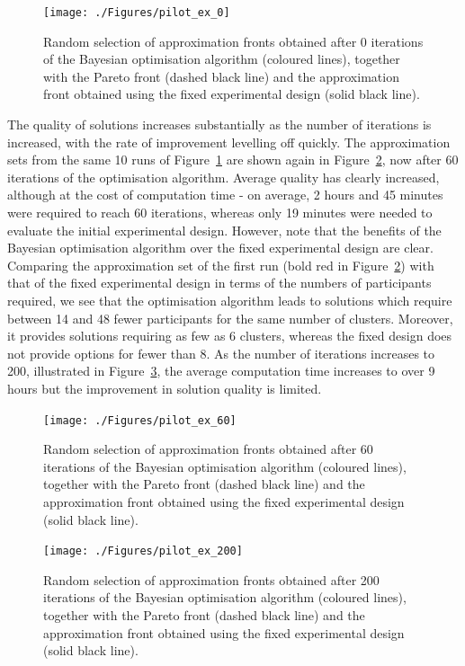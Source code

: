 \documentclass{article} %
\begin{document}
\begin{figure}
\centering
\texttt{[image: ./Figures/pilot\_ex\_0]}
\caption{Random selection of approximation fronts obtained after 0 iterations of the Bayesian optimisation algorithm (coloured lines), together with the Pareto front (dashed black line) and the approximation front obtained using the fixed experimental design (solid black line).}
\label{fig:pilot_ex_0}
\end{figure}

The quality of solutions increases substantially as the number of iterations is increased, with the rate of improvement levelling off quickly. The approximation sets from the same 10 runs of Figure~\ref{fig:pilot_ex_0} are shown again in Figure~\ref{fig:pilot_ex_60}, now after 60 iterations of the optimisation algorithm. Average quality has clearly increased, although at the cost of computation time - on average, 2 hours and 45 minutes were required to reach 60 iterations, whereas only 19 minutes were needed to evaluate the initial experimental design. However, note that the benefits of the Bayesian optimisation algorithm over the fixed experimental design are clear. Comparing the approximation set of the first run (bold red in Figure~\ref{fig:pilot_ex_60}) with that of the fixed experimental design in terms of the numbers of participants required, we see that the optimisation algorithm leads to solutions which require between 14 and 48 fewer participants for the same number of clusters. Moreover, it provides solutions requiring as few as 6 clusters, whereas the fixed design does not provide options for fewer than 8. As the number of iterations increases to 200, illustrated in Figure~\ref{fig:pilot_ex_200}, the average computation time increases to over 9 hours but the improvement in solution quality is limited.

\begin{figure}
\centering
\texttt{[image: ./Figures/pilot\_ex\_60]}
\caption{Random selection of approximation fronts obtained after 60 iterations of the Bayesian optimisation algorithm (coloured lines), together with the Pareto front (dashed black line) and the approximation front obtained using the fixed experimental design (solid black line).}
\label{fig:pilot_ex_60}
\end{figure}

\begin{figure}
\centering
\texttt{[image: ./Figures/pilot\_ex\_200]}
\caption{Random selection of approximation fronts obtained after 200 iterations of the Bayesian optimisation algorithm (coloured lines), together with the Pareto front (dashed black line) and the approximation front obtained using the fixed experimental design (solid black line).}
\label{fig:pilot_ex_200}
\end{figure}
\end{document}
